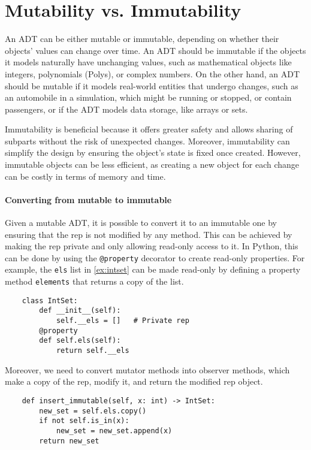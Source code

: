 \documentclass[oneside,11pt,dvipsnames]{book}
\newcommand{\code}[1]{\texttt{#1}}
\begin{document}
\section{Mutability vs. Immutability}\label{sec:mutability-vs-immutability}

An ADT can be either mutable or immutable, depending on whether their objects' values can change over time. An ADT should be immutable if the objects it models naturally have unchanging values, such as mathematical objects like integers, polynomials (Polys), or complex numbers. On the other hand, an ADT should be mutable if it models real-world entities that undergo changes, such as an automobile in a simulation, which might be running or stopped, or contain passengers, or if the ADT models data storage, like arrays or sets.

Immutability is beneficial because it offers greater safety and allows sharing of subparts without the risk of unexpected changes. Moreover, immutability can simplify the design by ensuring the object’s state is fixed once created. However, immutable objects can be less efficient, as creating a new object for each change can be costly in terms of memory and time.

\paragraph{Converting from mutable to immutable} 
Given a mutable ADT, it is possible to convert it to an immutable one by ensuring that the rep is not modified by any method. This can be achieved by making the rep private and only allowing read-only access to it. In Python, this can be done by using the \code{@property} decorator to create read-only properties. For example, the \code{els} list in \autoref{ex:intset} can be made read-only by defining a property method \code{elements} that returns a copy of the list.

\begin{lstlisting}
    class IntSet:
        def __init__(self):
            self.__els = []   # Private rep
        @property
        def self.els(self):
            return self.__els
\end{lstlisting}

Moreover, we need to convert mutator methods into observer methods, which make a copy of the rep, modify it, and return the modified rep object.  
\begin{lstlisting}
    def insert_immutable(self, x: int) -> IntSet:
        new_set = self.els.copy()
        if not self.is_in(x):
            new_set = new_set.append(x)
        return new_set
\end{lstlisting}
\end{document}

